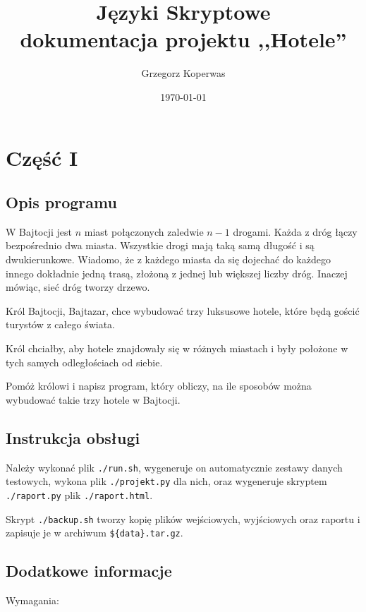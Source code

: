 \documentclass[12pt,a4paper]{article}
\begin{document}
	
	\title{Języki Skryptowe\\\small{dokumentacja projektu ,,Hotele''}}
	\author{Grzegorz Koperwas}
	\date{\today}

	\maketitle
	\newpage
	\section*{Część I}
	\subsection*{Opis programu}

    W Bajtocji jest $n$ miast połączonych zaledwie $n - 1$ drogami. Każda z dróg łączy bezpośrednio dwa miasta.
    Wszystkie drogi mają taką samą długość i są dwukierunkowe. Wiadomo, że z każdego miasta da się dojechać
    do każdego innego dokładnie jedną trasą, złożoną z jednej lub większej liczby dróg. Inaczej mówiąc, sieć dróg
    tworzy drzewo.

    Król Bajtocji, Bajtazar, chce wybudować trzy luksusowe hotele, które będą gościć turystów z całego świata.

    Król chciałby, aby hotele znajdowały się w różnych miastach i były położone w tych samych odległościach od
    siebie.

    Pomóż królowi i napisz program, który obliczy, na ile sposobów można
    wybudować takie trzy hotele w Bajtocji.

	\subsection*{Instrukcja obsługi}

    Należy wykonać plik \texttt{./run.sh}, wygeneruje on automatycznie zestawy
    danych testowych, wykona plik \texttt{./projekt.py} dla nich, oraz
    wygeneruje skryptem \texttt{./raport.py} plik \texttt{./raport.html}.

    Skrypt \texttt{./backup.sh} tworzy kopię plików wejściowych, wyjściowych
    oraz raportu i zapisuje je w archiwum \texttt{\$\{data\}.tar.gz}.


	\subsection*{Dodatkowe informacje}

    Wymagania:
\end{document}
